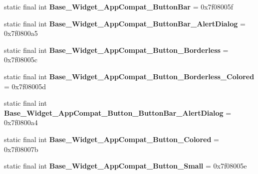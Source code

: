 \begin{DoxyCompactItemize}
\item 
\hypertarget{classandroid_1_1support_1_1v7_1_1appcompat_1_1_r_1_1style_adf27232a09e51af3ff01d1354d92428b}{}static final int {\bfseries Base\+\_\+\+Widget\+\_\+\+App\+Compat\+\_\+\+Button\+Bar} = 0x7f08005f\label{classandroid_1_1support_1_1v7_1_1appcompat_1_1_r_1_1style_adf27232a09e51af3ff01d1354d92428b}

\item 
\hypertarget{classandroid_1_1support_1_1v7_1_1appcompat_1_1_r_1_1style_a4cb110246229736e0218fa2daada9617}{}static final int {\bfseries Base\+\_\+\+Widget\+\_\+\+App\+Compat\+\_\+\+Button\+Bar\+\_\+\+Alert\+Dialog} = 0x7f0800a5\label{classandroid_1_1support_1_1v7_1_1appcompat_1_1_r_1_1style_a4cb110246229736e0218fa2daada9617}

\item 
\hypertarget{classandroid_1_1support_1_1v7_1_1appcompat_1_1_r_1_1style_a7a9571105f3d848f8fa36375eb207033}{}static final int {\bfseries Base\+\_\+\+Widget\+\_\+\+App\+Compat\+\_\+\+Button\+\_\+\+Borderless} = 0x7f08005c\label{classandroid_1_1support_1_1v7_1_1appcompat_1_1_r_1_1style_a7a9571105f3d848f8fa36375eb207033}

\item 
\hypertarget{classandroid_1_1support_1_1v7_1_1appcompat_1_1_r_1_1style_a3cbad8f9ee80cc10c4bacbc0f8d6bff9}{}static final int {\bfseries Base\+\_\+\+Widget\+\_\+\+App\+Compat\+\_\+\+Button\+\_\+\+Borderless\+\_\+\+Colored} = 0x7f08005d\label{classandroid_1_1support_1_1v7_1_1appcompat_1_1_r_1_1style_a3cbad8f9ee80cc10c4bacbc0f8d6bff9}

\item 
\hypertarget{classandroid_1_1support_1_1v7_1_1appcompat_1_1_r_1_1style_a9fd13b4ad3ed54dbd97ebcde3b83adb1}{}static final int {\bfseries Base\+\_\+\+Widget\+\_\+\+App\+Compat\+\_\+\+Button\+\_\+\+Button\+Bar\+\_\+\+Alert\+Dialog} = 0x7f0800a4\label{classandroid_1_1support_1_1v7_1_1appcompat_1_1_r_1_1style_a9fd13b4ad3ed54dbd97ebcde3b83adb1}

\item 
\hypertarget{classandroid_1_1support_1_1v7_1_1appcompat_1_1_r_1_1style_ab8551a77e3c16b43a85d6159629087f6}{}static final int {\bfseries Base\+\_\+\+Widget\+\_\+\+App\+Compat\+\_\+\+Button\+\_\+\+Colored} = 0x7f08007b\label{classandroid_1_1support_1_1v7_1_1appcompat_1_1_r_1_1style_ab8551a77e3c16b43a85d6159629087f6}

\item 
\hypertarget{classandroid_1_1support_1_1v7_1_1appcompat_1_1_r_1_1style_ae4b8bf3e528f1e685afe9dba173071ea}{}static final int {\bfseries Base\+\_\+\+Widget\+\_\+\+App\+Compat\+\_\+\+Button\+\_\+\+Small} = 0x7f08005e\label{classandroid_1_1support_1_1v7_1_1appcompat_1_1_r_1_1style_ae4b8bf3e528f1e685afe9dba173071ea}


\end{DoxyCompactItemize}
